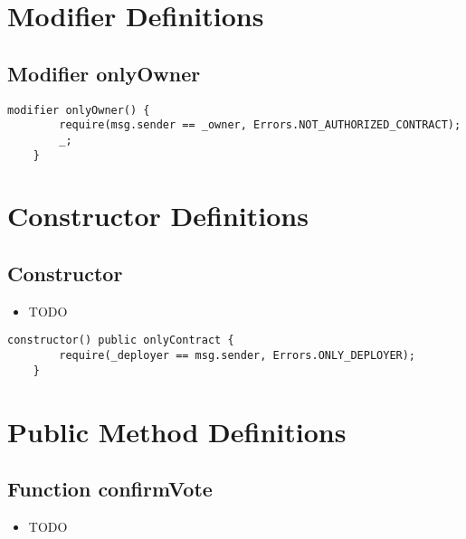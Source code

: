 \section{Modifier Definitions}


\subsection{Modifier onlyOwner}


\begin{lstlisting}[firstnumber=44]
    modifier onlyOwner() {
        require(msg.sender == _owner, Errors.NOT_AUTHORIZED_CONTRACT);
        _;
    }
\end{lstlisting}

\section{Constructor Definitions}


\subsection{Constructor}

\begin{itemize}
\item TODO
\end{itemize}

\begin{lstlisting}[firstnumber=49]
    constructor() public onlyContract {
        require(_deployer == msg.sender, Errors.ONLY_DEPLOYER);
    }
\end{lstlisting}

\section{Public Method Definitions}


\subsection{Function confirmVote}

\begin{itemize}
\item TODO
\end{itemize}


